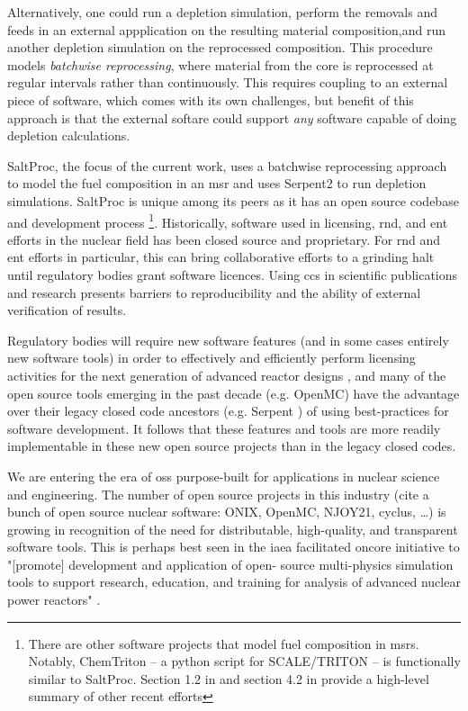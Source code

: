Alternatively, one could run a depletion simulation, perform the removals and feeds in an external appplication on the resulting material composition,and run another depletion simulation on the reprocessed composition. This procedure models {\it batchwise reprocessing}, where material from the core is reprocessed at regular intervals rather than continuously. This requires coupling to an external piece of software, which comes with its own challenges, but benefit of this approach is that the external softare could
support {\it any} software capable of doing depletion calculations.

SaltProc\cite{rykhlevskii_saltproc_2018}, the focus of the current work, uses a batchwise reprocessing approach to model the fuel composition in an \Gls{msr} and uses Serpent2\cite{leppanen_serpent_2014} to run depletion simulations. SaltProc is unique among its peers as it has an open source codebase and development process \footnote{There are other software projects that model fuel composition in \Gls{msr}s. Notably, ChemTriton\cite{betzler_molten_2017} -- a python script for SCALE/TRITON -- is
functionally similar to SaltProc. Section 1.2 in \cite{rykhlevskii_fuel_2020} and section 4.2 in \cite{rykhlevskii_advanced_2018} provide a high-level summary of other recent efforts}. 
Historically, software used in licensing, \Gls{rnd}, and \Gls{ent} efforts in the nuclear field has been closed source and proprietary. For \Gls{rnd} and \Gls{ent} efforts in particular, this can bring collaborative efforts to a grinding halt until regulatory bodies grant software licences. Using \Gls{cc}s in scientific publications and research presents barriers to reproducibility and the ability of external verification of results.
    
    Regulatory bodies will require new software features (and in some cases entirely new software tools) in order to effectively and efficiently perform licensing activities for the next generation of advanced reactor designs \cite{usnrc_nonlwr_2020-1}, and many of the open source tools emerging in the past decade (e.g. OpenMC\cite{romano_openmc_2015}) have the advantage over their legacy closed code ancestors (e.g. Serpent \cite{leppanen_serpent_2014}) of using best-practices for software development. It follows that these features and tools are more readily implementable in these new open source projects than in the legacy closed codes.
    
    We are entering the era of \Gls{oss} purpose-built for applications in nuclear science and engineering. The number of open source projects in this industry (cite a bunch of open source nuclear software:
ONIX, OpenMC, NJOY21, cyclus, \ldots) is growing in recognition of the need for distributable, high-quality, and transparent software tools. This is perhaps best seen in the \Gls{iaea} facilitated \Gls{oncore} initiative \cite{fiorina_initiative_2021} to "[promote] development and application of open- source multi-physics simulation tools to support research, education, and training for analysis of advanced nuclear power reactors"  \cite{iaea_open-source_2022}.

